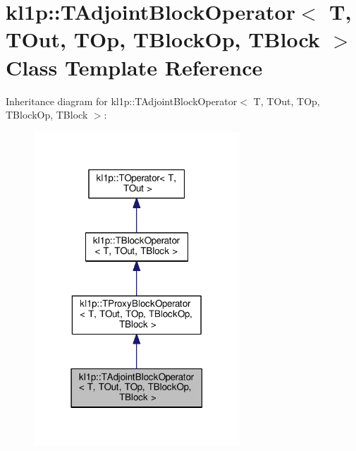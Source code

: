 \hypertarget{classkl1p_1_1TAdjointBlockOperator}{}\section{kl1p\+:\+:T\+Adjoint\+Block\+Operator$<$ T, T\+Out, T\+Op, T\+Block\+Op, T\+Block $>$ Class Template Reference}
\label{classkl1p_1_1TAdjointBlockOperator}


Inheritance diagram for kl1p\+:\+:T\+Adjoint\+Block\+Operator$<$ T, T\+Out, T\+Op, T\+Block\+Op, T\+Block $>$\+:
\nopagebreak
\begin{figure}[H]
\begin{center}
\leavevmode
\includegraphics[width=219pt]{classkl1p_1_1TAdjointBlockOperator__inherit__graph}
\end{center}
\end{figure}


